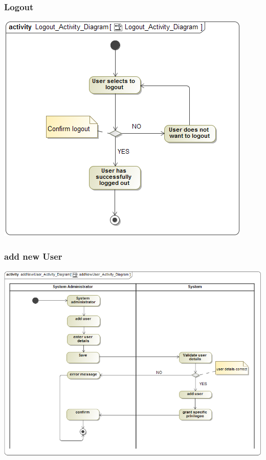 \documentclass[11pt]{article}
\begin{document}
	\newpage
	\subsubsection{Logout}
	\begin{center}
		\includegraphics[width=\textwidth]{../Images/Logout_Activity_Diagram.png}\\[0.5cm]
	\end{center}

	\newpage
	\subsubsection{add new User}
	\begin{center}
		\includegraphics[width=\textwidth]{../Images/addNewUser_Activity_Diagram.png}\\[0.5cm]
	\end{center}
	
\end{document}
